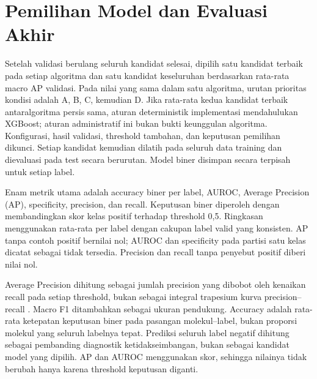 \section{Pemilihan Model dan Evaluasi Akhir}
Setelah validasi berulang seluruh kandidat selesai, dipilih satu kandidat terbaik pada setiap algoritma dan satu kandidat keseluruhan berdasarkan rata-rata macro AP validasi. Pada nilai yang sama dalam satu algoritma, urutan prioritas kondisi adalah A, B, C, kemudian D. Jika rata-rata kedua kandidat terbaik antaralgoritma persis sama, aturan deterministik implementasi mendahulukan XGBoost; aturan administratif ini bukan bukti keunggulan algoritma. Konfigurasi, hasil validasi, threshold tambahan, dan keputusan pemilihan dikunci. Setiap kandidat kemudian dilatih pada seluruh data training dan dievaluasi pada test secara berurutan. Model biner disimpan secara terpisah untuk setiap label.

Enam metrik utama adalah accuracy biner per label, AUROC, Average Precision (AP), specificity, precision, dan recall. Keputusan biner diperoleh dengan membandingkan skor kelas positif terhadap threshold 0,5. Ringkasan menggunakan rata-rata per label dengan cakupan label valid yang konsisten. AP tanpa contoh positif bernilai nol; AUROC dan specificity pada partisi satu kelas dicatat sebagai tidak tersedia. Precision dan recall tanpa penyebut positif diberi nilai nol.

Average Precision dihitung sebagai jumlah precision yang dibobot oleh kenaikan recall pada setiap threshold, bukan sebagai integral trapesium kurva precision--recall \cite{sklearnap2026}. Macro F1 ditambahkan sebagai ukuran pendukung. Accuracy adalah rata-rata ketepatan keputusan biner pada pasangan molekul--label, bukan proporsi molekul yang seluruh labelnya tepat. Prediksi seluruh label negatif dihitung sebagai pembanding diagnostik ketidakseimbangan, bukan sebagai kandidat model yang dipilih. AP dan AUROC menggunakan skor, sehingga nilainya tidak berubah hanya karena threshold keputusan diganti.

